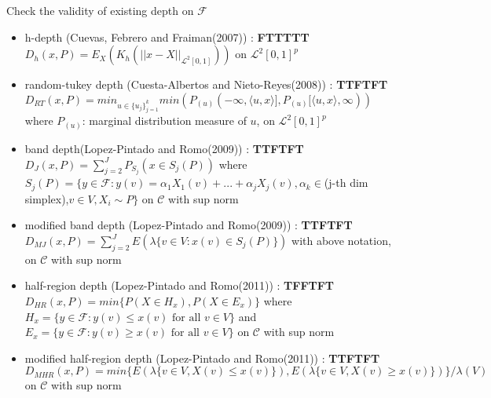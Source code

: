 \documentclass[aspectratio=169,ignorenonframetext,9pt]{beamer}
\theoremstyle{plain}
\theoremstyle{definition}
\begin{document}
\begin{frame}{Check the validity of existing depth on $\mathcal{F}$}
    \begin{itemize}
        \item h-depth (Cuevas, Febrero and Fraiman(2007)) : \textbf{FTTTTT}\\
        $D_h(x,P)=E_X(K_h(||x-X||_{\mathcal{L}^2[0,1]}))$ on $\mathcal{L}^2[0,1]^p$ 
        \item random-tukey depth (Cuesta-Albertos and Nieto-Reyes(2008)) : \textbf{TTFTFT}\\
        $D_{RT}(x,P)=min_{u\in\{u_j\}_{j=1}^k}min(P_{(u)}(-\infty,\langle u,x \rangle], P_{(u)}[\langle u,x \rangle,\infty))$ \\
        where $P_{(u)}$: marginal distribution measure of $u$, on $\mathcal{L}^2[0,1]^p$
        \item band depth(Lopez-Pintado and Romo(2009)) : \textbf{TTFTFT}\\
        $D_J(x,P)=\sum_{j=2}^J P_{S_j}(x\in S_j(P))$ where $S_j(P)=\{y\in\mathcal{F} : y(v)=\alpha_1X_1(v)+...+\alpha_jX_j(v), \alpha_k\in$(j-th dim simplex),$ v\in V, X_i\sim P\}$
        on $\mathcal{C}$ with sup norm 
        \item modified band depth (Lopez-Pintado and Romo(2009)) : \textbf{TTFTFT}\\
        $D_{MJ}(x,P)=\sum_{j=2}^J E(\lambda \{v\in V : x(v)\in S_j(P)\})$ with above notation,
        on $\mathcal{C}$ with sup norm 
        \item half-region depth (Lopez-Pintado and Romo(2011)) : \textbf{TFFTFT}\\
        $D_{HR}(x,P)=min\{P(X\in H_x), P(X\in E_x)\}$ where $H_x=\{y\in\mathcal{F} : y(v)\leq x(v) \text{ for all } v\in V\}$ and 
        $E_x=\{y\in\mathcal{F} : y(v)\geq x(v) \text{ for all } v\in V\}$ on $\mathcal{C}$ with sup norm 
        \item modified half-region depth (Lopez-Pintado and Romo(2011)) : \textbf{TTFTFT}\\
        $D_{MHR}(x,P)=min\{E(\lambda\{v\in V, X(v)\leq x(v)\}), E(\lambda\{v\in V, X(v)\geq x(v)\})\}/\lambda(V)$
        on $\mathcal{C}$ with sup norm
    \end{itemize}

\end{frame}
\end{document}
